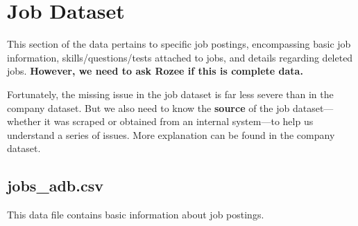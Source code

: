 \documentclass[12pt]{article}
\begin{document}

















































\newpage


\section{Job Dataset}
This section of the data pertains to specific job postings, encompassing basic job information, skills/questions/tests attached to jobs, and details regarding deleted jobs.  \textbf{However, we need to ask Rozee if this is complete data.}

Fortunately, the missing issue in the job dataset is far less severe than in the company dataset. But we also need to know the \textbf{source} of the job dataset—whether it was scraped or obtained from an internal system—to help us understand  a series of issues.  More explanation can be found in the company dataset.



\subsection{jobs\_adb.csv}
This data file contains basic information about job postings. 
\end{document}
